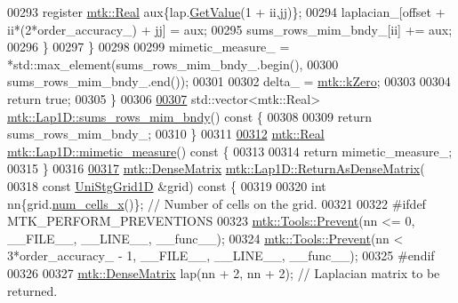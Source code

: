 \begin{DoxyCode}
00293       \textcolor{keyword}{register} \hyperlink{group__c01-roots_gac080bbbf5cbb5502c9f00405f894857d}{mtk::Real} aux\{lap.\hyperlink{classmtk_1_1DenseMatrix_a4b23ecbebd970b5eea915dbb50691024}{GetValue}(1 + ii,jj)\};
00294       laplacian\_[offset + ii*(2*order\_accuracy\_) + jj] = aux;
00295       sums\_rows\_mim\_bndy\_[ii] += aux;
00296     \}
00297   \}
00298 
00299     mimetic\_measure\_ = *std::max\_element(sums\_rows\_mim\_bndy\_.begin(),
00300                                       sums\_rows\_mim\_bndy\_.end());
00301 
00302   delta\_ = \hyperlink{group__c01-roots_ga59a451a5fae30d59649bcda274fea271}{mtk::kZero};
00303 
00304   \textcolor{keywordflow}{return} \textcolor{keyword}{true};
00305 \}
00306 
\hypertarget{mtk__lap__1d_8cc_source_l00307}{}\hyperlink{classmtk_1_1Lap1D_ad0f976d32700cd8b46aa99f5a8d9e38b}{00307} std::vector<mtk::Real> \hyperlink{classmtk_1_1Lap1D_ad0f976d32700cd8b46aa99f5a8d9e38b}{mtk::Lap1D::sums\_rows\_mim\_bndy}()\textcolor{keyword}{ const }\{
00308 
00309   \textcolor{keywordflow}{return} sums\_rows\_mim\_bndy\_;
00310 \}
00311 
\hypertarget{mtk__lap__1d_8cc_source_l00312}{}\hyperlink{classmtk_1_1Lap1D_a10a426657cccd1d6b25fbb58ed472d6f}{00312} \hyperlink{group__c01-roots_gac080bbbf5cbb5502c9f00405f894857d}{mtk::Real} \hyperlink{classmtk_1_1Lap1D_a10a426657cccd1d6b25fbb58ed472d6f}{mtk::Lap1D::mimetic\_measure}()\textcolor{keyword}{ const }\{
00313 
00314   \textcolor{keywordflow}{return} mimetic\_measure\_;
00315 \}
00316 
\hypertarget{mtk__lap__1d_8cc_source_l00317}{}\hyperlink{classmtk_1_1Lap1D_aaea34a17b0879e05eb4109645a2ba8f4}{00317} \hyperlink{classmtk_1_1DenseMatrix}{mtk::DenseMatrix} \hyperlink{classmtk_1_1Lap1D_aaea34a17b0879e05eb4109645a2ba8f4}{mtk::Lap1D::ReturnAsDenseMatrix}(
00318   \textcolor{keyword}{const} \hyperlink{classmtk_1_1UniStgGrid1D}{UniStgGrid1D} &grid)\textcolor{keyword}{ const }\{
00319 
00320   \textcolor{keywordtype}{int} nn\{grid.\hyperlink{classmtk_1_1UniStgGrid1D_af1b3729d8afa07be5b2775ed68015b80}{num\_cells\_x}()\};  \textcolor{comment}{// Number of cells on the grid.}
00321 
00322 \textcolor{preprocessor}{  #ifdef MTK\_PERFORM\_PREVENTIONS}
00323   \hyperlink{classmtk_1_1Tools_a332324c6f25e66be9dff48c5987a3b9f}{mtk::Tools::Prevent}(nn <= 0, \_\_FILE\_\_, \_\_LINE\_\_, \_\_func\_\_);
00324   \hyperlink{classmtk_1_1Tools_a332324c6f25e66be9dff48c5987a3b9f}{mtk::Tools::Prevent}(nn < 3*order\_accuracy\_ - 1, \_\_FILE\_\_, \_\_LINE\_\_, \_\_func\_\_);
00325 \textcolor{preprocessor}{  #endif}
00326 
00327   \hyperlink{classmtk_1_1DenseMatrix}{mtk::DenseMatrix} lap(nn + 2, nn + 2); \textcolor{comment}{// Laplacian matrix to be returned.}

\end{DoxyCode}
